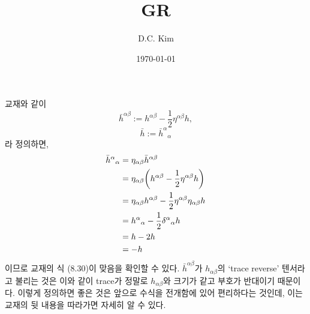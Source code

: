 \documentclass{article}
\title{GR}
\date{\today}
\author{D.C. Kim}
\begin{document}
	\maketitle
	교재와 같이
	\begin{equation}
		\bar{h}^{\alpha \beta} := h^{\alpha\beta} - \frac{1}{2}\eta^{\alpha\beta}h,
	\end{equation}
	\begin{equation}
		\bar{h}:= \bar{h}^\alpha {}_\alpha
	\end{equation}
	라 정의하면,
	\begin{align}
			\bar{h}^{\alpha}{}_\alpha &= \eta_{\alpha\beta} \bar{h}^{\alpha\beta}\\
			&= \eta_{\alpha\beta} \qty(h^{\alpha\beta} - \frac{1}{2}\eta^{\alpha \beta}h)\\
			&= \eta_{\alpha\beta}h^{\alpha\beta} - \frac{1}{2}\eta^{\alpha\beta}\eta_{\alpha\beta}h\\
			&= h^{\alpha}{}_\alpha - \frac{1}{2}\delta^\alpha{}_\alpha h\\
			&= h - 2h\\
			&= -h
	\end{align}
	이므로 교재의 식 (8.30)이 맞음을 확인할 수 있다. $\bar{h}^{\alpha\beta}$가 $h_{\alpha\beta}$의 `trace reverse' 텐서라고 불리는 것은 이와 같이 trace가 정말로 $h_{\alpha\beta}$와 크기가 같고 부호가 반대이기 때문이다. 이렇게 정의하면 좋은 것은 앞으로 수식을 전개함에 있어 편리하다는 것인데, 이는 교재의 뒷 내용을 따라가면 자세히 알 수 있다.
\end{document}
